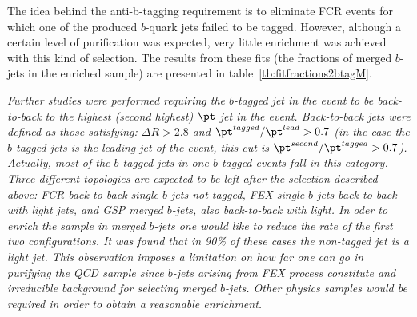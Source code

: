 The idea behind the anti-b-tagging requirement is to eliminate FCR events for which one of the produced $b$-quark jets failed to be tagged. However, although a certain level of purification was expected, very little enrichment was achieved with this kind of selection. The results from these fits (the fractions of merged $b$-jets in the enriched sample) are presented in  table~\ref{tb:fitfractions2btagM}.

\emph{Further studies were performed requiring the $b$-tagged jet in the event to be back-to-back to the highest (second highest) $\pt$ jet in the event.  Back-to-back jets were defined as those satisfying:  $\Delta R>2.8$ and  $\pt^{tagged}/\pt^{lead} > 0.7$  (in the case the $b$-tagged jets is the leading jet of the event, this cut is $\pt^{second}/\pt^{tagged} > 0.7$). Actually, most of the $b$-tagged jets in one-$b$-tagged events fall in this category. Three different topologies are expected to be left after the selection described above: FCR back-to-back single $b$-jets not tagged,  FEX single $b$-jets back-to-back with light jets, and GSP merged $b$-jets, also back-to-back with light. In oder to enrich the sample in merged $b$-jets one would like to reduce the rate of the first two configurations.  It was found that in 90\% of these cases the  non-tagged jet is a light jet. This observation imposes a limitation on how far one can go in purifying the QCD sample since $b$-jets arising from FEX process constitute and irreducible background for selecting merged $b$-jets. Other physics samples would be required in order to obtain a reasonable enrichment.}


